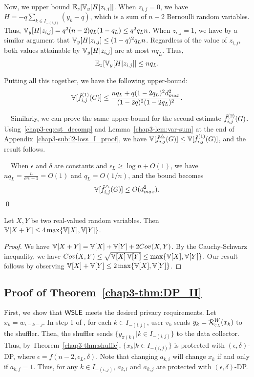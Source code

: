 Now, we upper bound $\operatorname{\mathbb{E}}_z[\operatorname{\mathbb{V}}_y[H | z_{i,j}]]$. When $z_{i,j} = 0$, we have $H =
-q \sum_{k \in I_{-(i,j)}} (y_{k}-q)$, which is a sum of $n-2$ Bernoulli random variables.
Thus, $\operatorname{\mathbb{V}}_y[H | z_{i,j}] = q^2 (n-2) q_L(1-q_L) \leq q^2 q_L n$. When $z_{i,j} = 1$, we have
by a similar argument that $\operatorname{\mathbb{V}}_y[H | z_{i,j}] \leq (1-q)^2 q_L n$. Regardless of the value
of $z_{i,j}$, both values attainable by $\operatorname{\mathbb{V}}_y[H | z_{i,j}]$ are at most $nq_L$.
Thus,
\[
\operatorname{\mathbb{E}}_z[\operatorname{\mathbb{V}}_y[H | z_{i,j}]] \leq n q_L.
\]

Putting all this together, we have the following upper-bound:
\[
  \operatorname{\mathbb{V}}[\hat{f}_{i,j}^{(1)}(G)] \leq \frac{n q_L + q(1-2q_L)^2 d_{max}^2}{(1-2q)^2(1-2q_L)^2}.
\]

\smallskip
{}~~Similarly, we can prove the same upper-bound for the second estimate $\hat{f}_{i,j}^{(2)}(G)$.
Using~\eqref{chap3-eq:est_decomp} and Lemma~\ref{chap3-lem:var-sum} at the end of Appendix~\ref{chap3-sub:l2-loss_I_proof}, we have
$\operatorname{\mathbb{V}}[\hat{f}_{i,j}^\triangle(G)] \leq \operatorname{\mathbb{V}}[\hat{f}_{i,j}^{(1)}(G)]$, and the result follows.

\smallskip
{}~~When $\epsilon$ and $\delta$ are constants
and $\epsilon_L \geq \log n + O(1)$, we
have $nq_L = \frac{n}{e^{\epsilon_L} + 1} = O(1)$ and
$q_L = O(1/n)$,
and the bound becomes
\[
  \operatorname{\mathbb{V}}[\hat{f}_{i,j}^\triangle(G)] \leq O(d_{max}^2).
\]\qed

\begin{lemma}\label{chap3-lem:var-sum}
  Let $X,Y$ be two real-valued random variables. Then $\operatorname{\mathbb{V}}[X+Y] \leq 4\max\{\operatorname{\mathbb{V}}[X], \operatorname{\mathbb{V}}[Y]\}$.
\end{lemma}
\begin{proof}
  We have $\operatorname{\mathbb{V}}[X+Y] = \operatorname{\mathbb{V}}[X] + \operatorname{\mathbb{V}}[Y] + 2Cov(X,Y)$. By the Cauchy-Schwarz
  inequality, we have $Cov(X,Y) \leq \sqrt{\operatorname{\mathbb{V}}[X]\operatorname{\mathbb{V}}[Y]} \leq \max\{\operatorname{\mathbb{V}}[X],
  \operatorname{\mathbb{V}}[Y]\}$. Our result follows by observing $\operatorname{\mathbb{V}}[X] + \operatorname{\mathbb{V}}[Y] \leq 2\max\{\operatorname{\mathbb{V}}[X],
  \operatorname{\mathbb{V}}[Y]\}$.
\end{proof}
\subsection{Proof of Theorem~\ref{chap3-thm:DP_II}}
\label{chap3-sub:DP_II_proof}
First, we show that $\textsf{WSLE}{}$ meets the desired privacy requirements.
Let $x_k = w_{i-k-j}$. In step 1 of \AlgWSLE{},
for each $k \in I_{-(i,j)}$, user $v_k$
sends $y_k = \mathcal{R}_{\varepsilon_L}^W(x_k)$ to the shuffler.
Then, the shuffler sends $\{y_{\pi(k)} | k \in I_{-(i,j)}\}$ to the data collector.
Thus, by Theorem~\ref{chap3-thm:shuffle},
$\{x_k | k \in I_{-(i,j)}\}$
is protected with $(\epsilon, \delta)$-DP, where $\epsilon = f(n-2, \epsilon_L, \delta)$.
Note that changing $a_{k,i}$ will change $x_k$ if and only if $a_{k,j} = 1$.
Thus, for any $k \in I_{-(i,j)}$, $a_{k,i}$ and $a_{k,j}$ are protected with $(\epsilon, \delta)$-DP.

